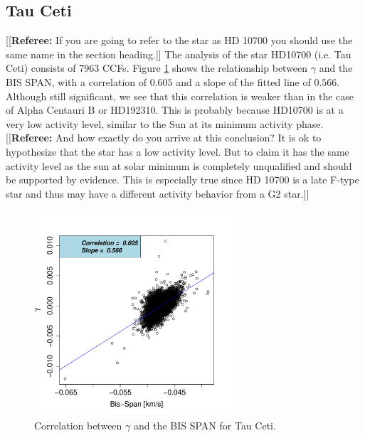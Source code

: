 \documentclass[11pt, oneside]{article}
\newcommand{\comment}[1]{{\color{red}[[\textbf{Referee: }#1]]}}
\begin{document}
\subsection{Tau Ceti}  \label{sec:Taucet}
\comment{If you are going to refer to the star as HD 10700 you should use the same name in the section heading.}
The analysis of the star HD10700 (i.e. Tau Ceti) consists of $7963$ CCFs. Figure \ref{fig:Tau:corr.gamma} shows the relationship between $\gamma$ and the BIS SPAN, with a correlation of $0.605$ and a slope of the fitted line of $0.566$. Although still significant, we see that this correlation is weaker than in the case of Alpha Centauri B or HD192310. This is probably because HD10700 is at a very low activity level, similar to the Sun at its minimum activity phase.
\comment{And how exactly do you arrive at this conclusion? It is ok to hypothesize that the star has a low activity level. But to claim it has the same activity level as the sun at solar minimum is completely unqualified and should be supported by evidence. This is especially true since HD 10700 is a late F-type star and thus may have a different activity behavior from a G2 star.}
%
\begin{figure}[htbp]
   \centering
\includegraphics[height = 3in]{HD10700_[2]gamma_vs_bisspan.pdf} 
   \caption{Correlation between $\gamma$ and the BIS SPAN for Tau Ceti.}
   \label{fig:Tau:corr.gamma}
\end{figure}
\end{document}
